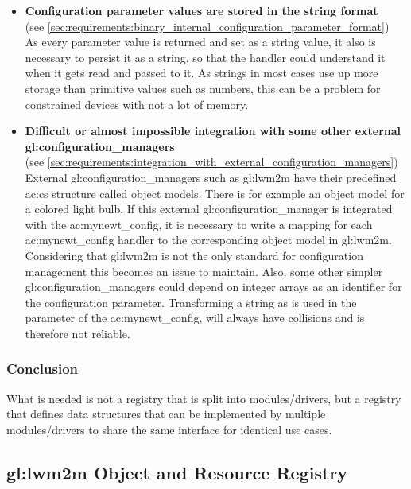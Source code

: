 \begin{itemize}
      \item \textbf{Configuration parameter values are stored in the string format}\\
            (see \autoref{sec:requirements:binary_internal_configuration_parameter_format})\\
            As every parameter value is returned and set as a string value, it also is necessary to persist it as a string, so that the handler could understand it when it gets read and passed to it.
            As strings in most cases use up more storage than primitive values such as numbers, this can be a problem for constrained devices with not a lot of memory.

      \item \textbf{Difficult or almost impossible integration with some other external \glspl{gl:configuration_manager}}\\
            (see \autoref{sec:requirements:integration_with_external_configuration_managers})\\
            External \glspl{gl:configuration_manager} such as \gls{gl:lwm2m} have their predefined \gls{ac:cs} structure called object models.
            There is for example an object model for a colored light bulb.
            If this external \gls{gl:configuration_manager} is integrated with the \gls{ac:mynewt_config}, it is necessary to write a mapping for each \gls{ac:mynewt_config} handler to the corresponding object model in \gls{gl:lwm2m}.
            Considering that \gls{gl:lwm2m} is not the only standard for configuration management this becomes an issue to maintain.
            Also, some other simpler \glspl{gl:configuration_manager} could depend on integer arrays as an identifier for the configuration parameter.
            Transforming a string as is used in the parameter of the \gls{ac:mynewt_config}, will always have collisions and is therefore not reliable.
\end{itemize}

\subsubsection{Conclusion}

What is needed is not a registry that is split into modules/drivers, but a registry that defines data structures that can be implemented by multiple modules/drivers to share the same interface for identical use cases.

\subsection{\gls*{gl:lwm2m} Object and Resource Registry}
\label{sec:related_work:lwm2m}

